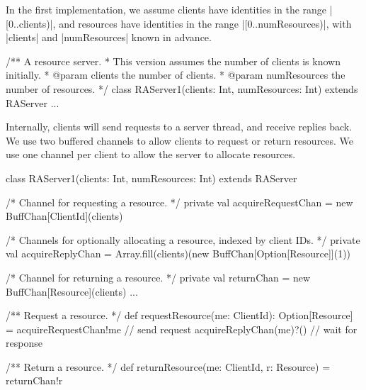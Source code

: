 
\begin{slide}

In the first implementation, we assume clients have identities in the range
|[0..clients)|, and resources have identities in the range
  |[0..numResources)|, with |clients| and |numResources| known in advance.
%
\begin{scala}
/** A resource server. 
  * This version assumes the number of clients is known initially. 
  * @param clients the number of clients.
  * @param numResources the number of resources.  */
class RAServer1(clients: Int, numResources: Int) extends RAServer{
  ...
}
\end{scala}
\end{slide}


\begin{slide}

Internally, clients will send requests to a server thread, and receive replies
back.  We use two buffered channels to allow clients to request or return
resources.  We use one channel per client to allow the server to allocate
resources.
%
\begin{scala}
class RAServer1(clients: Int, numResources: Int) extends RAServer{
  /* Channel for requesting a resource. */
  private val acquireRequestChan = new BuffChan[ClientId](clients)

  /* Channels for optionally allocating a resource, indexed by client IDs. */
  private val acquireReplyChan = 
    Array.fill(clients)(new BuffChan[Option[Resource]](1))

  /* Channel for returning a resource. */
  private val returnChan = new BuffChan[Resource](clients)
  ...
}
\end{scala}
\end{slide}


\begin{slide}

\begin{scala}
  /** Request a resource. */
  def requestResource(me: ClientId): Option[Resource] = {
    acquireRequestChan!me  // send request
    acquireReplyChan(me)?() // wait for response
  }

  /** Return a resource. */
  def returnResource(me: ClientId, r: Resource) = returnChan!r
\end{scala}
\end{slide}


